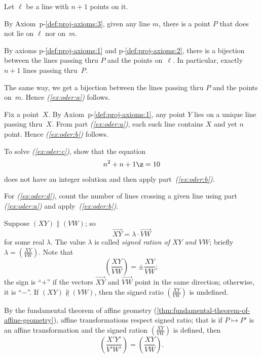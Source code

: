 Let $\ell$ be a line with $n+1$ points on it.

By Axiom~p-\ref{def:proj-axioms:3}, given any line $m$, there is a point $P$ that does not lie on $\ell$ nor on~$m$.

By axioms p-\ref{def:proj-axioms:1} and p-\ref{def:proj-axioms:2}, there is a bijection between the lines passing thru $P$ and the points on~$\ell$.
In particular, exactly $n+1$ lines passing thru~$P$.

The same way, we get a bijection between the lines passing thru $P$ and the points on~$m$. 
Hence \textit{(\ref{ex:oder:a})} follows.

Fix a point~$X$.
By Axiom~p-\ref{def:proj-axioms:1}, any point $Y$ lies on a unique line passing thru~$X$.
From part \textit{(\ref{ex:oder:a})}, each such line contains $X$ and yet $n$ point.
Hence \textit{(\ref{ex:oder:b})} follows.

To solve \textit{(\ref{ex:oder:c})}, show that the equation
\[n^2+n+1\z=10\] 
does not have  an integer solution and then apply part~\textit{(\ref{ex:oder:b})}.


For \textit{(\ref{ex:oder:d})}, count the number of lines crossing a given line using part \textit{(\ref{ex:oder:a})} and apply~\textit{(\ref{ex:oder:b})}.























Suppose $(XY)\parallel (VW)$; so
\[\overrightarrow{XY}=\lambda\cdot\overrightarrow{VW}\]
for some real $\lambda$.
The value $\lambda$ is called \emph{signed ration of $XY$ and $VW$};
briefly $\lambda=(\tfrac{XY}{VW})$.
Note that 
\[\left(\frac{XY}{VW}\right)=\pm \frac{XY}{VW};\]
the sign is ``$+$'' if the vectors $\overrightarrow{XY}$ and $\overrightarrow{VW}$ point in the same direction; otherwise, it is ``$-$''.
If $(XY)\nparallel (VW)$, then the signed ratio $(\tfrac{XY}{VW})$ is undefined.

By the fundamental theorem of affine geometry (\ref{thm:fundamental-theorem-of-affine-geometry}), affine transformations respect signed ratio;
that is if $P\mapsto P'$ is an affine transformation and the signed ration $(\tfrac{XY}{VW})$ is defined, then 
\[\left(\frac{X'Y'}{V'W'}\right)=\left(\frac{XY}{VW}\right).\]

